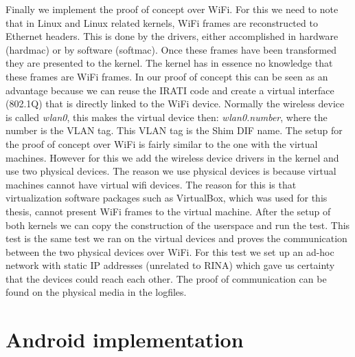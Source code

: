 Finally we implement the proof of concept over WiFi. For this we need to note that in Linux and Linux related kernels, WiFi frames are reconstructed to Ethernet headers. This is done by the drivers, either accomplished in hardware (hardmac) or by software (softmac). Once these frames have been transformed they are presented to the kernel. The kernel has in essence no knowledge that these frames are WiFi frames. In our proof of concept this can be seen as an advantage because we can reuse the IRATI code and create a virtual interface (802.1Q) that is directly linked to the WiFi device. Normally the wireless device is called \emph{wlan0}, this makes the virtual device then: \emph{wlan0.number}, where the number is the VLAN tag. This VLAN tag is the Shim DIF name.
\npar
The setup for the proof of concept over WiFi is fairly similar to the one with the virtual machines. However for this we add the wireless device drivers in the kernel and use two physical devices. The reason we use physical devices is because virtual machines cannot have virtual wifi devices. The reason for this is that virtualization software packages such as VirtualBox, which was used for this thesis, cannot present WiFi frames to the virtual machine. 
\npar
After the setup of both kernels we can copy the construction of the userspace and run the test. This test is the same test we ran on the virtual devices and proves the communication between the two physical devices over WiFi. For this test we set up an ad-hoc network with static IP addresses (unrelated to RINA) which gave us certainty that the devices could reach each other. The proof of communication can be found on the physical media in the logfiles.

\section{Android implementation}

